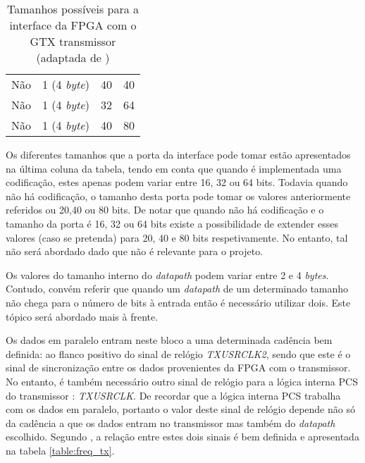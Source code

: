 \begin{table}[h!]
{\begin{tabular}{rlll}
			\multicolumn{1}{r|}{Não}                        & 1 (4 \textit{byte})                                       & 40                                           & 40                                                \\
			\multicolumn{1}{r|}{Não}                        & 1 (4 \textit{byte})                                       & 32                                           & 64                                                \\
			\multicolumn{1}{r|}{Não}                        & 1 (4 \textit{byte})                                       & 40                                           & 80                                                \\ \hline
		\end{tabular}%
	}
	\caption[Tamanhos possíveis para a interface da FPGA com o GTX transmissor]{Tamanhos possíveis para a interface da FPGA com o GTX transmissor (adaptada de \cite{R011})}
	\label{table:tx_interface}
\end{table}

Os diferentes tamanhos que a porta da interface pode tomar estão apresentados na última coluna da tabela, tendo em conta que quando é implementada uma codificação, estes apenas podem variar entre 16, 32 ou 64 bits. Todavia quando não há codificação, o tamanho desta porta pode tomar os valores anteriormente referidos ou 20,40 ou 80 bits. De notar que quando não há codificação e o tamanho da porta é 16, 32 ou 64 bits existe a possibilidade de extender esses valores (caso se pretenda) para 20, 40 e 80 bits respetivamente. No entanto, tal não será abordado dado que não é relevante para o projeto. 

Os valores do tamanho interno do \textit{datapath} podem variar entre 2 e 4 \textit{bytes}. Contudo, convém referir que quando um \textit{datapath} de um determinado tamanho não chega para o número de bits à entrada então é necessário utilizar dois. Este tópico será abordado mais à frente.

Os dados em paralelo entram neste bloco a uma determinada cadência bem definida: ao flanco positivo do sinal de relógio \textit{TXUSRCLK2}, sendo que este é o sinal de sincronização entre os dados provenientes da FPGA com o transmissor. No entanto, é também necessário outro sinal de relógio para a lógica interna PCS do transmissor : \textit{TXUSRCLK}. De recordar que a lógica interna PCS trabalha com os dados em paralelo, portanto o valor deste sinal de relógio depende não só da cadência a que os dados entram no transmissor mas também do \textit{datapath} escolhido. Segundo \cite{R011}, a relação entre estes dois sinais é bem definida e apresentada na tabela \ref{table:freq_tx}.

